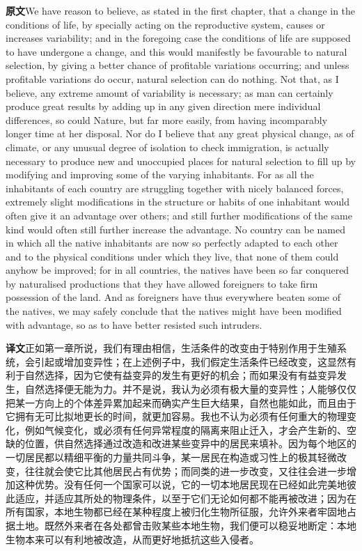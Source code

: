 \documentclass[UTF8,zihao=-4]{ctexart}
\newcommand{\BodyFont}{\fontsize{10.5pt}{15.5pt}\selectfont}
\newcommand{\origlabel}{\textbf{原文}\quad}
\newcommand{\translabel}{\textbf{译文}\quad}
\newenvironment{enblock}{\par\noindent\begingroup\BodyFont\origlabel}{\par\endgroup}
\newenvironment{zhblock}{\par\noindent\begingroup\BodyFont\translabel}{\par\endgroup\vspace{0.35em}}
\newcommand{\pair}[2]{\begin{enblock}#1\end{enblock}\begin{zhblock}#2\end{zhblock}}
\begin{document}
\pair{We have reason to believe, as stated in the first chapter, that a change in the conditions of life, by specially acting on the reproductive system, causes or increases variability; and in the foregoing case the conditions of life are supposed to have undergone a change, and this would manifestly be favourable to natural selection, by giving a better chance of profitable variations occurring; and unless profitable variations do occur, natural selection can do nothing. Not that, as I believe, any extreme amount of variability is necessary; as man can certainly produce great results by adding up in any given direction mere individual differences, so could Nature, but far more easily, from having incomparably longer time at her disposal. Nor do I believe that any great physical change, as of climate, or any unusual degree of isolation to check immigration, is actually necessary to produce new and unoccupied places for natural selection to fill up by modifying and improving some of the varying inhabitants. For as all the inhabitants of each country are struggling together with nicely balanced forces, extremely slight modifications in the structure or habits of one inhabitant would often give it an advantage over others; and still further modifications of the same kind would often still further increase the advantage. No country can be named in which all the native inhabitants are now so perfectly adapted to each other and to the physical conditions under which they live, that none of them could anyhow be improved; for in all countries, the natives have been so far conquered by naturalised productions that they have allowed foreigners to take firm possession of the land. And as foreigners have thus everywhere beaten some of the natives, we may safely conclude that the natives might have been modified with advantage, so as to have better resisted such intruders.}{正如第一章所说，我们有理由相信，生活条件的改变由于特别作用于生殖系统，会引起或增加变异性；在上述例子中，我们假定生活条件已经改变，这显然有利于自然选择，因为它使有益变异的发生有更好的机会；而如果没有有益变异发生，自然选择便无能为力。并不是说，我认为必须有极大量的变异性；人能够仅仅把某一方向上的个体差异累加起来而确实产生巨大结果，自然也能如此，而且由于它拥有无可比拟地更长的时间，就更加容易。我也不认为必须有任何重大的物理变化，例如气候变化，或必须有任何异常程度的隔离来阻止迁入，才会产生新的、空缺的位置，供自然选择通过改造和改进某些变异中的居民来填补。因为每个地区的一切居民都以精细平衡的力量共同斗争，某一居民在构造或习性上的极其轻微改变，往往就会使它比其他居民占有优势；而同类的进一步改变，又往往会进一步增加这种优势。没有任何一个国家可以说，它的一切本地居民现在已经如此完美地彼此适应，并适应其所处的物理条件，以至于它们无论如何都不能再被改进；因为在所有国家，本地生物都已经在某种程度上被归化生物所征服，允许外来者牢固地占据土地。既然外来者在各处都曾击败某些本地生物，我们便可以稳妥地断定：本地生物本来可以有利地被改造，从而更好地抵抗这些入侵者。}
\end{document}
